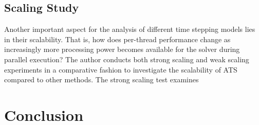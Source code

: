 \documentclass[
	11pt, 
	DIV10,
	ngerman,
	a4paper, 
	oneside, 
	headings=normal, 
	captions=tableheading,
	final, 
	numbers=noenddot
]{scrartcl}
\begin{document}
\subsection{Scaling Study}
Another important aspect for the analysis of different time stepping models lies in their scalability. That is, how does per-thread performance change as increasingly more processing power becomes available for the solver during parallel execution? The author conducts both strong scaling and weak scaling experiments in a comparative fashion to investigate the scalability of ATS compared to other methods. The strong scaling test examines 

\section{Conclusion}



\end{document}
